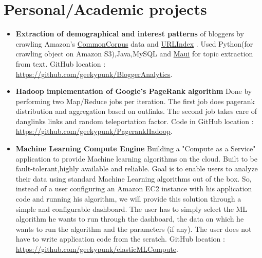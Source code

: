 \documentclass[11pt,a4paper]{moderncv}
\begin{document}
\section{Personal/Academic projects}
\begin{itemize}

\item  \textbf{Extraction of demographical and interest patterns} of bloggers by crawling Amazon's \href{http://aws.amazon.com/datasets/41740}{CommonCorpus} data and \href{https://github.com/trivio/common_crawl_index}{URLIndex} . Used Python(for crawling object on Amazon S3),Java,MySQL and \href{http://code.google.com/p/maui-indexer/}{Maui} for topic extraction from text. GitHub location : \href{https://github.com/geekypunk/BloggerAnalytics}{https://github.com/geekypunk/BloggerAnalytics}. \vspace{3ex}
\item  \textbf{Hadoop implementation of Google's PageRank algorithm} \newline  
Done by performing two Map/Reduce jobs per iteration. The first job does pagerank distribution and aggregation based on outlinks. The second job takes care of danglinks links and random teleportation factor. Code in GitHub location : \href{https://github.com/geekypunk/PagerankHadoop} {https://github.com/geekypunk/PagerankHadoop}. \vspace{3ex}
\item \textbf{Machine Learning Compute Engine} \newline  
Building a "Compute as a Service" application to provide Machine learning algorithms on the cloud. Built to be fault-tolerant,highly available and reliable. Goal is to enable users to analyze their data using standard Machine Learning algorithms out of the box. So, instead of a user configuring an Amazon EC2 instance with his application code and running his algorithm, we will provide this solution through a simple and configurable dashboard. The user has to simply select the ML algorithm he wants to run through the dashboard, the data on which he wants to run the algorithm and the parameters (if any). The user does not have to write application code from the scratch. GitHub location : \href{https://github.com/geekypunk/elasticMLCompute} {https://github.com/geekypunk/elasticMLCompute}. \hspace{1ex}
\end{itemize}

\end{document}
